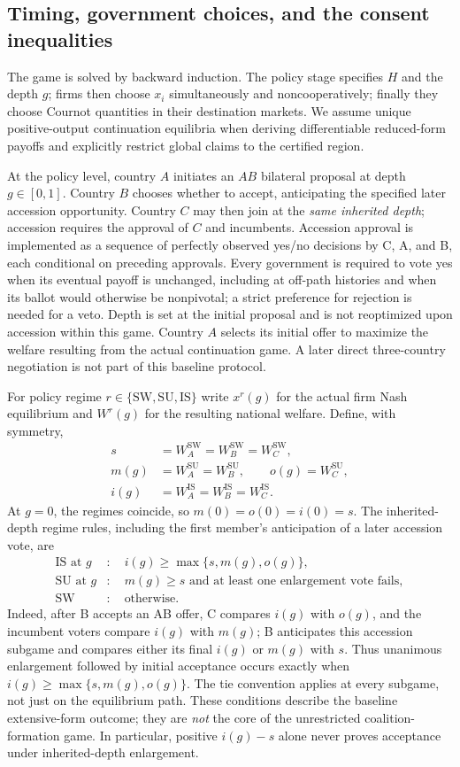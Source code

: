 \documentclass[11pt,a4paper]{article}
\theoremstyle{remark}\newtheorem{remark}[theorem]{Remark}
\newcommand{\SW}{\mathrm{SW}}\newcommand{\SU}{\mathrm{SU}}\newcommand{\IS}{\mathrm{IS}}
\begin{document}
\subsection{Timing, government choices, and the consent inequalities}
The game is solved by backward induction. The policy stage specifies $H$ and the depth $g$; firms then choose $x_i$ simultaneously and noncooperatively; finally they choose Cournot quantities in their destination markets. We assume unique positive-output continuation equilibria when deriving differentiable reduced-form payoffs and explicitly restrict global claims to the certified region.

At the policy level, country $A$ initiates an $AB$ bilateral proposal at depth $g\in[0,1]$. Country $B$ chooses whether to accept, anticipating the specified later accession opportunity. Country $C$ may then join at the \emph{same inherited depth}; accession requires the approval of $C$ and incumbents. Accession approval is implemented as a sequence of perfectly observed yes/no decisions by C, A, and B, each conditional on preceding approvals. Every government is required to vote yes when its eventual payoff is unchanged, including at off-path histories and when its ballot would otherwise be nonpivotal; a strict preference for rejection is needed for a veto. Depth is set at the initial proposal and is not reoptimized upon accession within this game. Country $A$ selects its initial offer to maximize the welfare resulting from the actual continuation game. A later direct three-country negotiation is not part of this baseline protocol.

For policy regime $r\in\{\SW,\SU,\IS\}$ write $x^r(g)$ for the actual firm Nash equilibrium and $W^r(g)$ for the resulting national welfare. Define, with symmetry,
\begin{align}\label{eq:payoffs}
s&=W_A^{\SW}=W_B^{\SW}=W_C^{\SW},\nonumber\\
m(g)&=W_A^{\SU}=W_B^{\SU},\qquad o(g)=W_C^{\SU},\nonumber\\
i(g)&=W_A^{\IS}=W_B^{\IS}=W_C^{\IS}.
\end{align}
At $g=0$, the regimes coincide, so $m(0)=o(0)=i(0)=s$. The inherited-depth regime rules, including the first member's anticipation of a later accession vote, are
\begin{align}\label{eq:consent}
\IS\text{ at }g &: \quad i(g)\ge\max\{s,m(g),o(g)\},\\
\SU\text{ at }g &: \quad m(g)\ge s\text{ and at least one enlargement vote fails},\nonumber\\
\SW &: \quad\text{otherwise}.\nonumber
\end{align}
Indeed, after B accepts an AB offer, C compares $i(g)$ with $o(g)$, and the incumbent voters compare $i(g)$ with $m(g)$; B anticipates this accession subgame and compares either its final $i(g)$ or $m(g)$ with $s$. Thus unanimous enlargement followed by initial acceptance occurs exactly when $i(g)\ge\max\{s,m(g),o(g)\}$. The tie convention applies at every subgame, not just on the equilibrium path. These conditions describe the baseline extensive-form outcome; they are \emph{not} the core of the unrestricted coalition-formation game. In particular, positive $i(g)-s$ alone never proves acceptance under inherited-depth enlargement.
\end{document}
